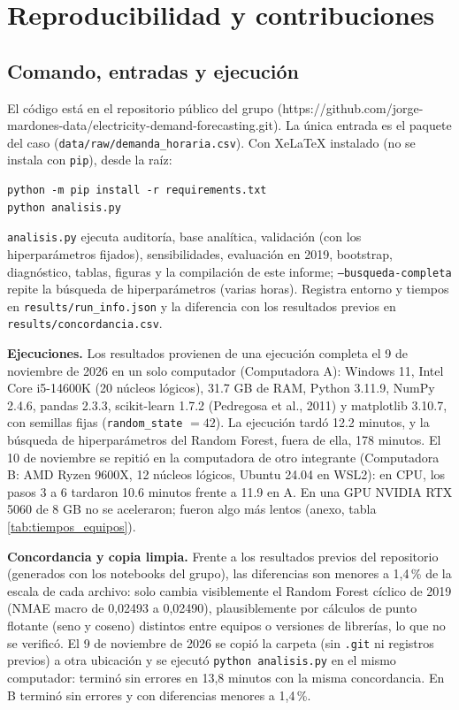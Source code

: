 \section{Reproducibilidad y contribuciones}

\subsection{Comando, entradas y ejecución} \label{sec:repro}

El código está en el repositorio público del grupo (https://github.com/jorge-mardones-data/electricity-demand-forecasting.git). La única entrada es el paquete del caso (\texttt{data/raw/demanda\_horaria.csv}). Con XeLaTeX instalado (no se instala con \texttt{pip}), desde la raíz:
\begin{verbatim}
python -m pip install -r requirements.txt
python analisis.py
\end{verbatim}
\texttt{analisis.py} ejecuta auditoría, base analítica, validación (con los hiperparámetros fijados), sensibilidades, evaluación en 2019, bootstrap, diagnóstico, tablas, figuras y la compilación de este informe; \texttt{--busqueda-completa} repite la búsqueda de hiperparámetros (varias horas). Registra entorno y tiempos en \texttt{results/run\_info.json} y la diferencia con los resultados previos en \texttt{results/concordancia.csv}.

\textbf{Ejecuciones.} Los resultados provienen de una ejecución completa el 9 de noviembre de 2026 en un solo computador (Computadora A): Windows 11, Intel Core i5-14600K (20 núcleos lógicos), 31.7 GB de RAM, Python 3.11.9, NumPy 2.4.6, pandas 2.3.3, scikit-learn 1.7.2 (Pedregosa et al., 2011) y matplotlib 3.10.7, con semillas fijas (\texttt{random\_state} $=42$). La ejecución tardó 12.2 minutos, y la búsqueda de hiperparámetros del Random Forest, fuera de ella, 178 minutos. El 10 de noviembre se repitió en la computadora de otro integrante (Computadora B: AMD Ryzen 9600X, 12 núcleos lógicos, Ubuntu 24.04 en WSL2): en CPU, los pasos 3 a 6 tardaron 10.6 minutos frente a 11.9 en A. En una GPU NVIDIA RTX 5060 de 8 GB no se aceleraron; fueron algo más lentos (anexo, tabla \ref{tab:tiempos_equipos}).

\textbf{Concordancia y copia limpia.} Frente a los resultados previos del repositorio (generados con los notebooks del grupo), las diferencias son menores a 1,4\,\% de la escala de cada archivo: solo cambia visiblemente el Random Forest cíclico de 2019 (NMAE macro de 0,02493 a 0,02490), plausiblemente por cálculos de punto flotante (seno y coseno) distintos entre equipos o versiones de librerías, lo que no se verificó. El 9 de noviembre de 2026 se copió la carpeta (sin \texttt{.git} ni registros previos) a otra ubicación y se ejecutó \texttt{python analisis.py} en el mismo computador: terminó sin errores en 13,8 minutos con la misma concordancia. En B terminó sin errores y con diferencias menores a 1,4\,\%.

